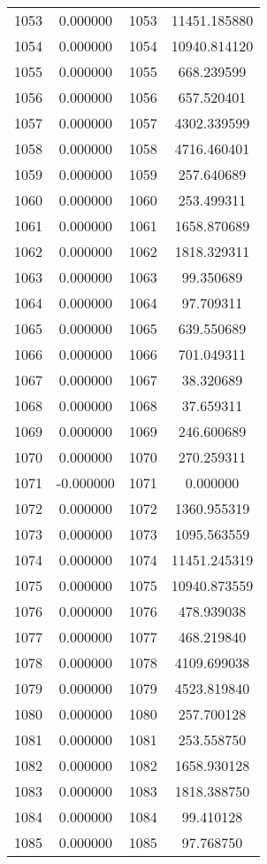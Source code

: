 \documentclass[12pt]{article}
\begin{document}
\begin{longtable}{@{}cccc@{}}
1053 & 0.000000 & 1053 & 11451.185880 \\
1054 & 0.000000 & 1054 & 10940.814120 \\
1055 & 0.000000 & 1055 & 668.239599 \\
1056 & 0.000000 & 1056 & 657.520401 \\
1057 & 0.000000 & 1057 & 4302.339599 \\
1058 & 0.000000 & 1058 & 4716.460401 \\
1059 & 0.000000 & 1059 & 257.640689 \\
1060 & 0.000000 & 1060 & 253.499311 \\
1061 & 0.000000 & 1061 & 1658.870689 \\
1062 & 0.000000 & 1062 & 1818.329311 \\
1063 & 0.000000 & 1063 & 99.350689 \\
1064 & 0.000000 & 1064 & 97.709311 \\
1065 & 0.000000 & 1065 & 639.550689 \\
1066 & 0.000000 & 1066 & 701.049311 \\
1067 & 0.000000 & 1067 & 38.320689 \\
1068 & 0.000000 & 1068 & 37.659311 \\
1069 & 0.000000 & 1069 & 246.600689 \\
1070 & 0.000000 & 1070 & 270.259311 \\
1071 & -0.000000 & 1071 & 0.000000 \\
1072 & 0.000000 & 1072 & 1360.955319 \\
1073 & 0.000000 & 1073 & 1095.563559 \\
1074 & 0.000000 & 1074 & 11451.245319 \\
1075 & 0.000000 & 1075 & 10940.873559 \\
1076 & 0.000000 & 1076 & 478.939038 \\
1077 & 0.000000 & 1077 & 468.219840 \\
1078 & 0.000000 & 1078 & 4109.699038 \\
1079 & 0.000000 & 1079 & 4523.819840 \\
1080 & 0.000000 & 1080 & 257.700128 \\
1081 & 0.000000 & 1081 & 253.558750 \\
1082 & 0.000000 & 1082 & 1658.930128 \\
1083 & 0.000000 & 1083 & 1818.388750 \\
1084 & 0.000000 & 1084 & 99.410128 \\
1085 & 0.000000 & 1085 & 97.768750 \\

\end{longtable}
\end{document}
